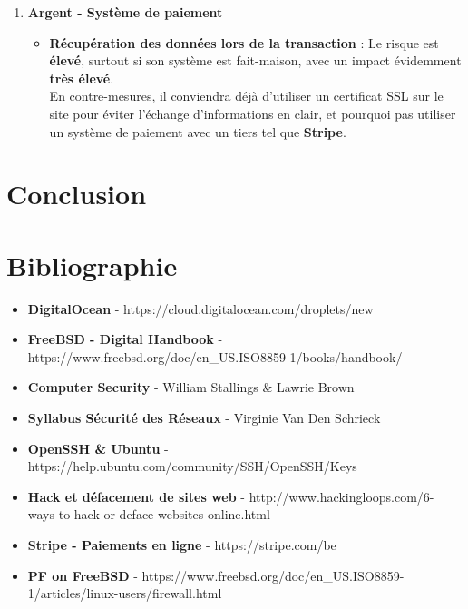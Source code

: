 \documentclass[a4paper,10pt,final,fleqn]{article}
\begin{document}
\begin{enumerate}
				\item \textbf{Argent - Système de paiement}

					\begin{itemize}
						\item \textbf{Récupération des données lors de la transaction} : Le risque est \textbf{élevé}, surtout si son système est fait-maison, avec un impact évidemment \textbf{très élevé}.\\
						En contre-mesures, il conviendra déjà d'utiliser un certificat SSL sur le site pour éviter l'échange d'informations en clair, et pourquoi pas utiliser un système de paiement avec un tiers tel que \textbf{Stripe}.\\
					\end{itemize}
					
			\end{enumerate}

	\section{Conclusion}

	\section{Bibliographie}

		\begin{itemize}
			\item \textbf{DigitalOcean} - https://cloud.digitalocean.com/droplets/new
			\item \textbf{FreeBSD - Digital Handbook} - https://www.freebsd.org/doc/en\_US.ISO8859-1/books/handbook/
			\item \textbf{Computer Security} - William Stallings \& Lawrie Brown
			\item \textbf{Syllabus Sécurité des Réseaux} - Virginie Van Den Schrieck
			\item \textbf{OpenSSH \& Ubuntu} - https://help.ubuntu.com/community/SSH/OpenSSH/Keys
			\item \textbf{Hack et défacement de sites web} - http://www.hackingloops.com/6-ways-to-hack-or-deface-websites-online.html
			\item \textbf{Stripe - Paiements en ligne} - https://stripe.com/be
			\item \textbf{PF on FreeBSD} - https://www.freebsd.org/doc/en_US.ISO8859-1/articles/linux-users/firewall.html
		\end{itemize}
\end{document}
